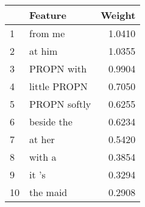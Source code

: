 \begin{tabular}{llr}
\toprule
{} &       Feature &  Weight \\
\midrule
1  &       from me &  1.0410 \\
2  &        at him &  1.0355 \\
3  &    PROPN with &  0.9904 \\
4  &  little PROPN &  0.7050 \\
5  &  PROPN softly &  0.6255 \\
6  &    beside the &  0.6234 \\
7  &        at her &  0.5420 \\
8  &        with a &  0.3854 \\
9  &         it 's &  0.3294 \\
10 &      the maid &  0.2908 \\
\bottomrule
\end{tabular}
